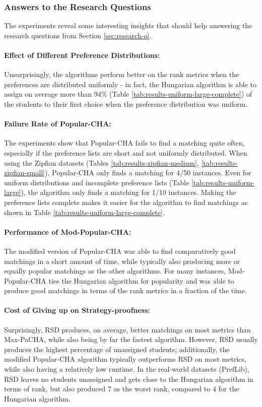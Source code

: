 \subsubsection{Answers to the Research Questions}
The experiments reveal some interesting insights that should help answering the research questions from Section \ref{sec:research-q}.

\paragraph{Effect of Different Preference Distributions:} Unsurprisingly, the algorithms perform better on the rank metrics when the preferences are distributed uniformly - in fact, the Hungarian algorithm is able to assign on average more than 94\% (Table \ref{tab:results-uniform-large-complete}) of the students to their first choice when the preference distribution was uniform.
\paragraph{Failure Rate of Popular-CHA:} The experiments show that \mbox{Popular-CHA} fails to find a matching quite often, especially if the preference lists are short and not uniformly distributed. When using the Zipfian datasets (Tables \ref{tab:results-zipfian-medium}, \ref{tab:results-zipfian-small}), Popular-CHA only finds a matching for 4/50 instances. Even for uniform distributions and incomplete preference lists (Table \ref{tab:results-uniform-large}), the algorithm only finds a matching for 1/10 instances. Making the preference lists complete makes it easier for the algorithm to find matchings as shown in Table \ref{tab:results-uniform-large-complete}.
\paragraph{Performance of Mod-Popular-CHA:} The modified version of Popular-CHA was able to find comparatively good matchings in a short amount of time, while typically also producing more or equally popular matchings as the other algorithms. For many instances, Mod-Popular-CHA ties the Hungarian algorithm for popularity and was able to produce good matchings in terms of the rank metrics in a fraction of the time.
\paragraph{Cost of Giving up on Strategy-proofness:} Surprisingly, RSD produces, on average, better matchings on most metrics than Max-PaCHA, while also being by far the fastest algorithm. However, RSD usually produces the highest percentage of unassigned students; additionally, the modified Popular-CHA algorithm typically outperforms RSD on most metrics, while also having a relatively low runtime. In the real-world datasets (PrefLib), RSD leaves no students unassigned and gets close to the Hungarian algorithm in terms of rank, but also produced 7 as the worst rank, compared to 4 for the Hungarian algorithm. 
